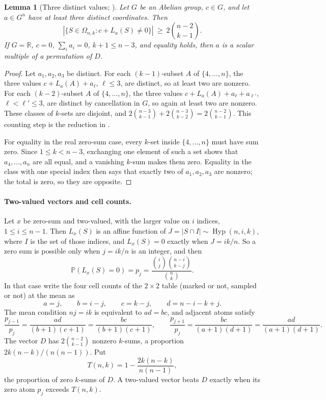 \documentclass[11pt]{article}
\newtheorem{lemma}[theorem]{Lemma}
\theoremstyle{remark}
\newcommand{\R}{\mathbb R}
\newcommand{\Prb}{\mathbb P}
\newcommand{\Hyp}{\operatorname{Hyp}}
\begin{document}
\begin{lemma}[Three distinct values; \cite{MVV}]\label{lem:three}
Let \(G\) be an Abelian group, \(c\in G\), and let \(a\in G^n\) have at least
three distinct coordinates. Then
\[
 |\{S\in\Omega_{n,k}:c+L_a(S)\ne0\}|\ \ge\ 2\binom{n-2}{k-1}.
\]
If \(G=\R\), \(c=0\), \(\sum_ia_i=0\), \(k+1\le n-3\), and equality holds, then
\(a\) is a scalar multiple of a permutation of \(D\).
\end{lemma}
\begin{proof}
Let \(a_1,a_2,a_3\) be distinct. For each \((k-1)\)-subset \(A\) of
\(\{4,\ldots,n\}\), the three values \(c+L_a(A)+a_\ell\), \(\ell\le3\), are
distinct, so at least two are nonzero. For each \((k-2)\)-subset \(A\) of
\(\{4,\ldots,n\}\), the three values \(c+L_a(A)+a_\ell+a_{\ell'}\),
\(\ell<\ell'\le3\), are distinct by cancellation in \(G\), so again at least
two are nonzero. These classes of \(k\)-sets are disjoint, and
\(2\binom{n-3}{k-1}+2\binom{n-3}{k-2}=2\binom{n-2}{k-1}\). This counting step
is the reduction in \cite[Theorem~1]{MVV}.

For equality in the real zero-sum case, every \(k\)-set inside
\(\{4,\ldots,n\}\) must have sum zero. Since \(1\le k<n-3\), exchanging one
element of such a set shows that \(a_4,\ldots,a_n\) are all equal, and a
vanishing \(k\)-sum makes them zero. Equality in the class with one special
index then says that exactly two of \(a_1,a_2,a_3\) are nonzero; the total is
zero, so they are opposite.
\end{proof}

\paragraph{Two-valued vectors and cell counts.}
Let \(x\) be zero-sum and two-valued, with the larger value on \(i\) indices,
\(1\le i\le n-1\). Then \(L_x(S)\) is an affine function of
\(J=|S\cap I|\sim\Hyp(n,i,k)\), where \(I\) is the set of those indices, and
\(L_x(S)=0\) exactly when \(J=ik/n\). So a zero sum is possible only when
\(j=ik/n\) is an integer, and then
\begin{equation}\label{eq:meanatom}
 \Prb(L_x(S)=0)=p_j=\frac{\binom ij\binom{n-i}{k-j}}{\binom nk}.
\end{equation}
In that case write the four cell counts of the \(2\times2\) table (marked or
not, sampled or not) at the mean as
\[
 a=j,\qquad b=i-j,\qquad c=k-j,\qquad d=n-i-k+j .
\]
The mean condition \(nj=ik\) is equivalent to \(ad=bc\), and adjacent atoms
satisfy
\begin{equation}\label{eq:ratios}
 \frac{p_{j-1}}{p_j}=\frac{ad}{(b+1)(c+1)}=\frac{bc}{(b+1)(c+1)},\qquad
 \frac{p_{j+1}}{p_j}=\frac{bc}{(a+1)(d+1)}=\frac{ad}{(a+1)(d+1)} .
\end{equation}
The vector \(D\) has \(2\binom{n-2}{k-1}\) nonzero \(k\)-sums, a proportion
\(2k(n-k)/(n(n-1))\). Put
\begin{equation}\label{eq:T}
 T(n,k)=1-\frac{2k(n-k)}{n(n-1)},
\end{equation}
the proportion of zero \(k\)-sums of \(D\). A two-valued vector beats \(D\)
exactly when its zero atom \(p_j\) exceeds \(T(n,k)\).
\end{document}
